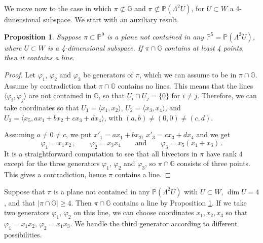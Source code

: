 \documentclass[10pt,reqno]{amsart}
\newcommand{\la}{\langle}
\newcommand{\ra}{\rangle}
\newcommand{\GG}{\mathbb{G}}
\newcommand{\PP}{\mathbb P}
\newcommand{\f}{\varphi}
\renewcommand{\L}{\Lambda}
\newtheorem{proposition}[theorem]{Proposition}
\theoremstyle{definition}
\begin{document}

\noindent We move now to the case in which $\pi \not \subset \GG$ and $\pi \not \subset \PP(\L^2 U)$, for $U\subset W$ a 4-dimensional subspace. We start with an auxiliary result. 

\begin{proposition} \label{prop:pi-must-contain-line}
Suppose $\pi \subset \PP^9$ is a plane not contained in any $\PP^5=\PP(\L^2 U)$, where $U\subset W$ is a 4-dimensional subspace. If $\pi\cap\GG$ contains at least 4 points, then it contains a line.
\end{proposition}
\begin{proof}
Let $\f_1$, $\f_2$ and $\f_3$ be generators of $\pi$, which we can assume to be in $\pi\cap\GG$. Assume by contradiction that $\pi \cap \GG$ contains no lines. This means that the lines $\la \f_i, \f_j \ra$ are not contained in $\GG$, so that $U_i \cap U_j=\{0\}$ for $i \ne j$. Therefore, we can take coordinates so that $U_1=\la x_1, x_2 \ra$, $U_2=\la x_3, x_4 \ra$, and $U_3=\la x_5, ax_1+bx_2+cx_3+dx_4 \ra$, with $(a,b) \ne (0,0) \ne (c,d)$.


\item Assuming $a \ne 0 \ne c$, we put $x'_1=ax_1+bx_2$, $x'_3=cx_3+dx_4$ and we get
\[
\f_1=x_1x_2 \,, \qquad \f_2=x_3x_4 \qquad \textrm{and}
\qquad \f_3=x_5(x_1+x_3)\,.
\]
It is a straightforward computation to see that all bivectors in $\pi$ have rank $4$ except for the three generators $\f_1$, $\f_2$ and $\f_3$, so $\pi \cap \GG$ consists of three points. This gives a contradiction, hence $\pi$ contains a line.
\end{proof}


\noindent Suppose that $\pi$ is a plane not contained in any $\PP(\L^2 U)$ with $U\subset W$, $\dim U=4$, and that $|\pi\cap\GG|\geq 4$. Then $\pi \cap \GG$ contains a line by Proposition \ref{prop:pi-must-contain-line}. If we take two generators $\f_1$, $\f_2$ on this line, we can choose coordinates $x_1,x_2,x_3$ so that $\f_1=x_1x_2$, $\f_2=x_1x_3$. We handle the third generator according to different possibilities.
\end{document}
